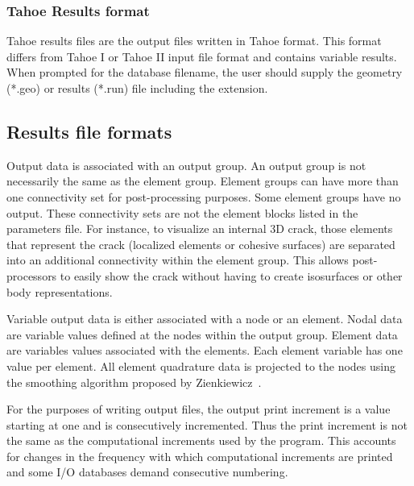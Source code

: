 \subsubsection{\textsf{Tahoe Results} format}
\label{sect.file.patran}
Tahoe results files are the output files written in Tahoe format. This format 
differs from Tahoe I or Tahoe II input file format and contains variable 
results. When prompted for the database filename, the user should supply the 
geometry (*.geo) or results (*.run) file including the extension. 

\subsection{Results file formats}
\label{sect.file.results}
Output data is associated with an output group.  An output group is not
necessarily the same as the element group.  Element groups can have more
than one connectivity set for post-processing purposes.  Some element
groups have no output.  These connectivity sets are not the element blocks
listed in the parameters file.  For instance, to visualize an internal 3D
crack, those elements that represent the crack (localized elements or
cohesive surfaces) are separated into an additional connectivity within the
element group.  This allows post-processors to easily show the crack
without having to create isosurfaces or other body representations.

Variable output data is either associated with a node or an element.  Nodal
data are variable values defined at the nodes within the output group. 
Element data are variables values associated with the elements.  Each
element variable has one value per element.  All element quadrature data is
projected to the nodes using the smoothing algorithm proposed by 
Zienkiewicz~\cite{Zienkiewicz}.

For the purposes of writing output files, the output print increment is a
value starting at one and is consecutively incremented.  Thus the print
increment is not the same as the computational increments used by the
program.  This accounts for changes in the frequency with which
computational increments are printed and some I/O databases demand
consecutive numbering.

